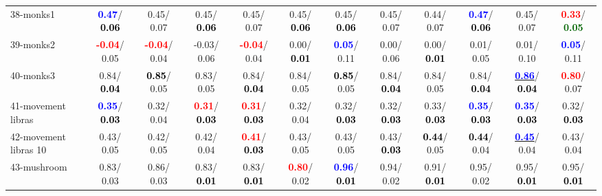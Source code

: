 \begin{table}[h]
\begin{center}
{\begin{tabular}{lc|c|c|c|c|c|c|c|c|c|c}
38-monks1 & \textcolor{blue}{\textbf{  0.47}}/\textcolor{black}{\textbf{  0.06}} &   0.45/  0.07 &   0.45/\textcolor{black}{\textbf{  0.06}} &   0.45/  0.07 &   0.45/\textcolor{black}{\textbf{  0.06}} &   0.45/\textcolor{black}{\textbf{  0.06}} &   0.45/  0.07 &   0.44/  0.07 & \textcolor{blue}{\textbf{  0.47}}/\textcolor{black}{\textbf{  0.06}} &   0.45/  0.07 & \textcolor{red}{\textbf{  0.33}}/\textcolor{darkgreen}{\textbf{  0.05}} \\
39-monks2 & \textcolor{red}{\textbf{ -0.04}}/  0.05 & \textcolor{red}{\textbf{ -0.04}}/  0.04 &  -0.03/  0.06 & \textcolor{red}{\textbf{ -0.04}}/  0.04 &   0.00/\textcolor{black}{\textbf{  0.01}} & \textcolor{blue}{\textbf{  0.05}}/  0.11 &   0.00/  0.06 &   0.00/\textcolor{black}{\textbf{  0.01}} &   0.01/  0.05 &   0.01/  0.10 & \textcolor{blue}{\textbf{  0.05}}/  0.11 \\ \hline
40-monks3 &   0.84/\textcolor{black}{\textbf{  0.04}} & \textcolor{black}{\textbf{  0.85}}/  0.05 &   0.83/  0.05 &   0.84/\textcolor{black}{\textbf{  0.04}} &   0.84/  0.05 & \textcolor{black}{\textbf{  0.85}}/  0.05 &   0.84/\textcolor{black}{\textbf{  0.04}} &   0.84/  0.05 &   0.84/\textcolor{black}{\textbf{  0.04}} & \underline{\textcolor{blue}{\textbf{  0.86}}}/\textcolor{black}{\textbf{  0.04}} & \textcolor{red}{\textbf{  0.80}}/  0.07 \\
41-movement libras & \textcolor{blue}{\textbf{  0.35}}/\textcolor{black}{\textbf{  0.03}} &   0.32/  0.04 & \textcolor{red}{\textbf{  0.31}}/\textcolor{black}{\textbf{  0.03}} & \textcolor{red}{\textbf{  0.31}}/\textcolor{black}{\textbf{  0.03}} &   0.32/  0.04 &   0.32/\textcolor{black}{\textbf{  0.03}} &   0.32/\textcolor{black}{\textbf{  0.03}} &   0.33/\textcolor{black}{\textbf{  0.03}} & \textcolor{blue}{\textbf{  0.35}}/\textcolor{black}{\textbf{  0.03}} & \textcolor{blue}{\textbf{  0.35}}/\textcolor{black}{\textbf{  0.03}} &   0.32/\textcolor{black}{\textbf{  0.03}} \\
42-movement libras 10 &   0.43/  0.05 &   0.42/  0.05 &   0.42/  0.04 & \textcolor{red}{\textbf{  0.41}}/\textcolor{black}{\textbf{  0.03}} &   0.43/  0.05 &   0.43/  0.05 &   0.43/\textcolor{black}{\textbf{  0.03}} & \textcolor{black}{\textbf{  0.44}}/  0.05 & \textcolor{black}{\textbf{  0.44}}/  0.04 & \underline{\textcolor{blue}{\textbf{  0.45}}}/  0.04 &   0.43/  0.04 \\
43-mushroom &   0.83/  0.03 &   0.86/  0.03 &   0.83/\textcolor{black}{\textbf{  0.01}} &   0.83/\textcolor{black}{\textbf{  0.01}} & \textcolor{red}{\textbf{  0.80}}/  0.02 & \textcolor{blue}{\textbf{  0.96}}/\textcolor{black}{\textbf{  0.01}} &   0.94/  0.02 &   0.91/\textcolor{black}{\textbf{  0.01}} &   0.95/  0.02 &   0.95/\textcolor{black}{\textbf{  0.01}} &   0.95/\textcolor{black}{\textbf{  0.01}} \\

\end{tabular}}
\end{center}
\end{table}
